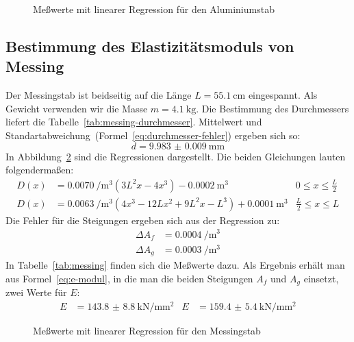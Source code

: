 \begin{figure}
  \centering
  \caption{Meßwerte mit linearer Regression für den Aluminiumstab}
  \label{fig:aluminium}
\end{figure}


\subsection{Bestimmung des Elastizitätsmoduls von Messing}

Der Messingstab ist beidseitig auf die Länge $L =
\SI{55.1}{\centi\metre}$ eingespannt. Als Gewicht verwenden wir die
Masse $m = \SI{4.1}{\kilogram}$. Die Bestimmung des Durchmessers liefert
die Tabelle~\ref{tab:messing-durchmesser}. Mittelwert und
Standartabweichung~(Formel~\eqref{eq:durchmesser-fehler}) ergeben sich so:
%
\begin{equation}
  d = \SI{9.983(9)}{\milli\meter}
\end{equation}
%
In Abbildung~\ref{fig:messing} sind die Regressionen
dargestellt. Die beiden Gleichungen lauten folgendermaßen:
%
\begin{align}
  D(x) &= \SI{0.0070}{\per\cubic\metre} 
  ( 3L^2x-4x^3 ) - \SI{0.0002}{\cubic\metre} 
  & 0 \le x \le \frac{L}{2}\\
  D(x) &= \SI{0.0063}{\per\cubic\metre}
  (4x^3 - 12Lx^2 + 9L^2x - L^3) + \SI{0.0001}{\cubic\metre} 
  & \frac{L}{2} \le x \le L
\end{align}
%
Die Fehler für die Steigungen ergeben sich aus der Regression zu:
%
\begin{align}
  \Delta A_f &= \SI{0.0004}{\per\cubic\metre}\\
  \Delta A_g &= \SI{0.0003}{\per\cubic\metre}
\end{align}
%
In Tabelle~\ref{tab:messing} finden sich die Meßwerte dazu. Als
Ergebnis erhält man aus Formel~\eqref{eq:e-modul}, in die man die beiden
Steigungen $A_f$ und $A_g$ einsetzt, zwei Werte für $E$:
\begin{align}
 E&=\SI{143.8(88)}{\kilo\newton\per\milli\metre\squared} &
 E&=\SI{159.4(54)}{\kilo\newton\per\milli\metre\squared}
\end{align}

\begin{figure}
  \centering
  \caption{Meßwerte mit linearer Regression für den Messingstab}
  \label{fig:messing}
\end{figure}

